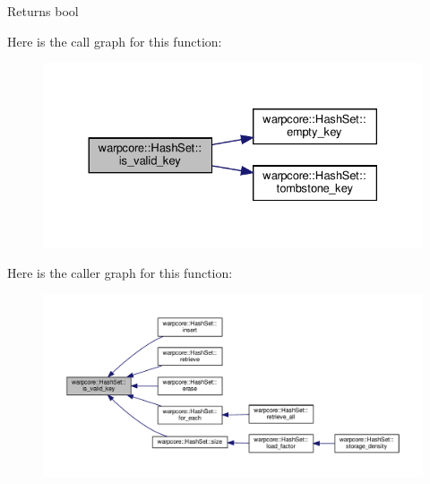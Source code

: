 \begin{DoxyReturn}{Returns}
{\ttfamily bool} 
\end{DoxyReturn}
Here is the call graph for this function\+:
\nopagebreak
\begin{figure}[H]
\begin{center}
\leavevmode
\includegraphics[width=330pt]{classwarpcore_1_1HashSet_a529de8c2b747588ef825661ba12b4c25_cgraph}
\end{center}
\end{figure}
Here is the caller graph for this function\+:
\nopagebreak
\begin{figure}[H]
\begin{center}
\leavevmode
\includegraphics[width=350pt]{classwarpcore_1_1HashSet_a529de8c2b747588ef825661ba12b4c25_icgraph}
\end{center}
\end{figure}
\mbox{\label{classwarpcore_1_1HashSet_a986019ba68d32cd8270d34e106f12c9a}} 
